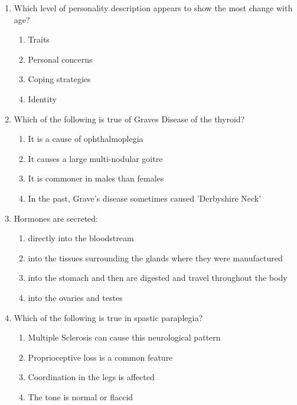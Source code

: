 \documentclass[12pt]{article}
\begin{document}
\begin{enumerate}[label=\arabic*.]
\begin{enumerate}[label=(\alph*)]
    \item sunna
    \item corpus spongiosum
    \item septum
    \item prepuce
\end{enumerate}
\item Which level of personality description appears to show the most change with age?
\begin{enumerate}[label=(\alph*)]
    \item Traits
    \item Personal concerns
    \item Coping strategies
    \item Identity
\end{enumerate}
\item Which of the following is true of Graves Disease of the thyroid?
\begin{enumerate}[label=(\alph*)]
    \item It is a cause of ophthalmoplegia
    \item It causes a large multi-nodular goitre
    \item It is commoner in males than females
    \item In the past, Grave's disease sometimes caused 'Derbyshire Neck'
\end{enumerate}
\item Hormones are secreted:
\begin{enumerate}[label=(\alph*)]
    \item directly into the bloodstream
    \item into the tissues surrounding the glands where they were manufactured
    \item into the stomach and then are digested and travel throughout the body
    \item into the ovaries and testes
\end{enumerate}
\item Which of the following is true in spastic paraplegia?
\begin{enumerate}[label=(\alph*)]
    \item Multiple Sclerosis can cause this neurological pattern
    \item Proprioceptive loss is a common feature
    \item Coordination in the legs is affected
    \item The tone is normal or flaccid
\end{enumerate}

\end{enumerate}
\end{document}
